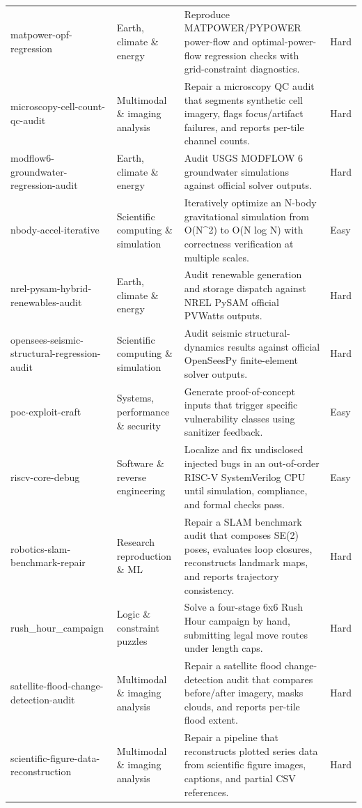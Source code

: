 \begin{longtable}{p{}p{}p{}p{}}
matpower-opf-regression & Earth, climate \& energy & Reproduce MATPOWER/PYPOWER power-flow and optimal-power-flow regression checks with grid-constraint diagnostics. & Hard \\
microscopy-cell-count-qc-audit & Multimodal \& imaging analysis & Repair a microscopy QC audit that segments synthetic cell imagery, flags focus/artifact failures, and reports per-tile channel counts. & Hard \\
modflow6-groundwater-regression-audit & Earth, climate \& energy & Audit USGS MODFLOW 6 groundwater simulations against official solver outputs. & Hard \\
nbody-accel-iterative & Scientific computing \& simulation & Iteratively optimize an N-body gravitational simulation from O(N\textasciicircum{}2) to O(N log N) with correctness verification at multiple scales. & Easy \\
nrel-pysam-hybrid-renewables-audit & Earth, climate \& energy & Audit renewable generation and storage dispatch against NREL PySAM official PVWatts outputs. & Hard \\
opensees-seismic-structural-regression-audit & Scientific computing \& simulation & Audit seismic structural-dynamics results against official OpenSeesPy finite-element solver outputs. & Hard \\
poc-exploit-craft & Systems, performance \& security & Generate proof-of-concept inputs that trigger specific vulnerability classes using sanitizer feedback. & Easy \\
riscv-core-debug & Software \& reverse engineering & Localize and fix undisclosed injected bugs in an out-of-order RISC-V SystemVerilog CPU until simulation, compliance, and formal checks pass. & Easy \\
robotics-slam-benchmark-repair & Research reproduction \& ML & Repair a SLAM benchmark audit that composes SE(2) poses, evaluates loop closures, reconstructs landmark maps, and reports trajectory consistency. & Hard \\
rush\_hour\_campaign & Logic \& constraint puzzles & Solve a four-stage 6x6 Rush Hour campaign by hand, submitting legal move routes under length caps. & Hard \\
satellite-flood-change-detection-audit & Multimodal \& imaging analysis & Repair a satellite flood change-detection audit that compares before/after imagery, masks clouds, and reports per-tile flood extent. & Hard \\
scientific-figure-data-reconstruction & Multimodal \& imaging analysis & Repair a pipeline that reconstructs plotted series data from scientific figure images, captions, and partial CSV references. & Hard \\

\end{longtable}
